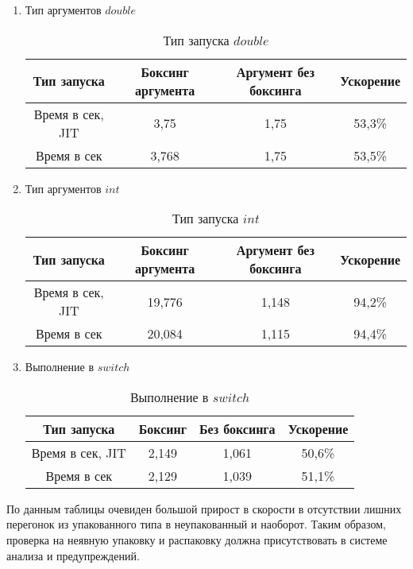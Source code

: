 \documentclass{mipt-thesis-bs}
\begin{document}
\begin{enumerate}
    \item Тип аргументов $double$
\begin{table}[h]
    \centering
    \begin{tabular}{|c|c|c|c|}
      \hline
      Тип запуска & Боксинг аргумента & Аргумент без боксинга & Ускорение \\
      \hline
      Время в сек, JIT & 3,75 & 1,75 & 53,3\% \\
      \hline
      Время в сек & 3,768 & 1,75 & 53,5\% \\
      \hline
    \end{tabular}
    \caption{Тип запуска $double$}
  \end{table}

  \item Тип аргументов $int$

\begin{table}[h]
    \centering
    \begin{tabular}{|c|c|c|c|}
      \hline
      Тип запуска & Боксинг аргумента & Аргумент без боксинга & Ускорение \\
      \hline
      Время в сек, JIT & 19,776 & 1,148 & 94,2\% \\
      \hline
      Время в сек & 20,084 & 1,115 & 94,4\% \\
      \hline
    \end{tabular}
    \caption{Тип запуска $int$}
  \end{table}

  \item Выполнение в $switch$
  \begin{table}[h]
    \centering
    \begin{tabular}{|c|c|c|c|}
      \hline
      Тип запуска & Боксинг & Без боксинга & Ускорение \\
      \hline
      Время в сек, JIT & 2,149 & 1,061 & 50,6\% \\
      \hline
      Время в сек & 2,129 & 1,039 & 51,1\% \\
      \hline
    \end{tabular}
    \caption{Выполнение в $switch$}
  \end{table}
\end{enumerate}

По данным таблицы очевиден большой прирост в скорости в отсутствии
лишних перегонок из упакованного типа в неупакованный и наоборот.
Таким образом, проверка на неявную упаковку и распаковку должна
присутствовать в системе анализа и предупреждений.
\end{document}

